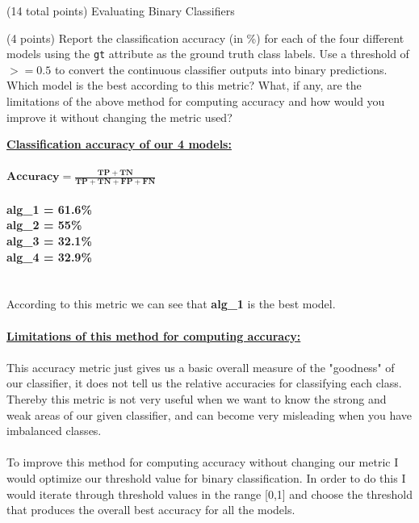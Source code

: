 \documentclass[12pt]{article}
\begin{document}
\begin{question}{(14 total points) Evaluating Binary Classifiers}





%
%
\begin{subquestion}{(4 points) Report the classification accuracy (in \%) for each of the four different models using the \texttt{gt} attribute as the ground truth class labels. 
Use a threshold of $>= 0.5$ to convert the continuous classifier outputs into binary predictions. 
Which model is the best according to this metric?
What, if any, are the limitations of the above method for computing accuracy and how would you improve it without changing the metric used?
}


\begin{answerbox}{32em}
\large{\textbf{\underline{Classification accuracy of our 4 models:}}}\\
\\
\normalsize{
$\mathbf{Accuracy = \frac{TP+TN}{TP+TN+FP+FN}}$\\
\\
\textbf{alg\_1 = 61.6\%}
\\
\textbf{alg\_2 = 55\%}
\\
\textbf{alg\_3 = 32.1\%}
\\
\textbf{alg\_4 = 32.9\%}
\\
\\
\\
According to this metric we can see that \textbf{alg\_1} is the best model.\\
\\
\textbf{\underline{Limitations of this method for computing accuracy:}}\\
\\
This accuracy metric just gives us a basic overall measure of the "goodness" of our classifier, it does not tell us the relative accuracies for classifying each class. Thereby this metric is not very useful when we want to know the strong and weak areas of our given classifier, and can become very misleading when you have imbalanced classes.\\
\\
To improve this method for computing accuracy without changing our metric I would optimize our threshold value for binary classification. In order to do this I would iterate through threshold values in the range [0,1] and choose the threshold that produces the overall best accuracy for all the models.
}
\end{answerbox}




\end{subquestion}
\end{question}
\end{document}
